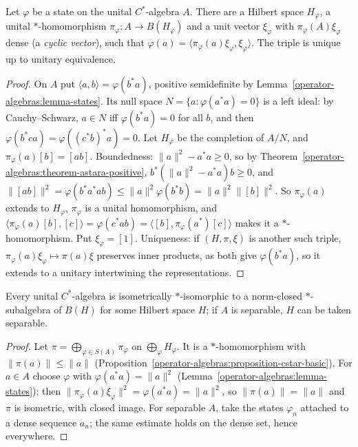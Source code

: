 \begin{theorem}\label{operator-algebras:theorem-gns}
Let $\varphi$ be a state on the unital $C^*$-algebra $A$. There are a Hilbert space $H_\varphi$, a unital $*$-homomorphism $\pi_\varphi \colon A \to B(H_\varphi)$ and a unit vector $\xi_\varphi$ with $\pi_\varphi(A)\xi_\varphi$ dense
(a \emph{cyclic vector}), such that $\varphi(a) = \langle\pi_\varphi(a)\xi_\varphi, \xi_\varphi\rangle$. The triple is unique up to unitary equivalence.
\end{theorem}

\begin{proof}
On $A$ put $\langle a, b\rangle = \varphi(b^*a)$, positive semidefinite by Lemma~\ref{operator-algebras:lemma-states}. Its null space $N = \{a : \varphi(a^*a) = 0\}$ is a left ideal: by Cauchy--Schwarz, $a \in N$ iff $\varphi(b^*a) = 0$
for all $b$, and then $\varphi(b^*ca) = \varphi((c^*b)^*a) = 0$. Let $H_\varphi$ be the completion of $A/N$, and $\pi_\varphi(a)[b] = [ab]$. Boundedness: $\|a\|^2 - a^*a \geq 0$, so by
Theorem~\ref{operator-algebras:theorem-astara-positive}, $b^*(\|a\|^2 - a^*a)b \geq 0$, and $\|[ab]\|^2 = \varphi(b^*a^*ab) \leq \|a\|^2\varphi(b^*b) = \|a\|^2\|[b]\|^2$. So $\pi_\varphi(a)$ extends to $H_\varphi$, $\pi_\varphi$ is a unital
homomorphism, and $\langle\pi_\varphi(a)[b], [c]\rangle = \varphi(c^*ab) = \langle[b], \pi_\varphi(a^*)[c]\rangle$ makes it a $*$-homomorphism. Put $\xi_\varphi = [1]$. Uniqueness: if $(H, \pi, \xi)$ is another such triple,
$\pi_\varphi(a)\xi_\varphi \mapsto \pi(a)\xi$ preserves inner products, as both give $\varphi(b^*a)$, so it extends to a unitary intertwining the representations.
\end{proof}

\begin{theorem}\label{operator-algebras:theorem-gelfand-naimark}
Every unital $C^*$-algebra is isometrically $*$-isomorphic to a norm-closed $*$-subalgebra of $B(H)$ for some Hilbert space $H$; if $A$ is separable, $H$ can be taken separable.
\end{theorem}

\begin{proof}
Let $\pi = \bigoplus_{\varphi \in S(A)}\pi_\varphi$ on $\bigoplus_\varphi H_\varphi$. It is a $*$-homomorphism with $\|\pi(a)\| \leq \|a\|$ (Proposition~\ref{operator-algebras:proposition-cstar-basic}). For $a \in A$ choose $\varphi$ with
$\varphi(a^*a) = \|a\|^2$ (Lemma~\ref{operator-algebras:lemma-states}); then $\|\pi_\varphi(a)\xi_\varphi\|^2 = \varphi(a^*a) = \|a\|^2$, so $\|\pi(a)\| = \|a\|$ and $\pi$ is isometric, with closed image. For separable $A$, take
the states $\varphi_n$ attached to a dense sequence $a_n$; the same estimate holds on the dense set, hence everywhere.
\end{proof}

